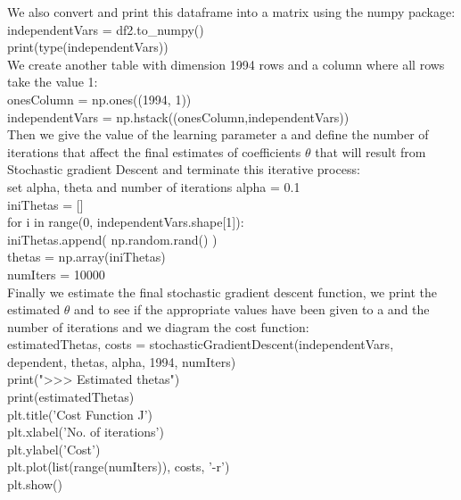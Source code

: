 \documentclass[10pt,a4paper]{article}
\begin{document}
We also convert and print this dataframe into a matrix using the numpy package:\\
independentVars = df2.to\_numpy()\\
print(type(independentVars))\\

We create another table with dimension 1994 rows and a column where all rows take the value 1:\\
onesColumn = np.ones((1994, 1))\\
independentVars = np.hstack((onesColumn,independentVars))\\

Then we give the value of the learning parameter a and define the number of iterations that affect the final estimates of coefficients $\theta$ that will result from Stochastic gradient Descent and terminate this iterative process:\\
set alpha, theta and number of iterations
alpha = 0.1\\
iniThetas = []\\
for i in range(0, independentVars.shape[1]):\\
iniThetas.append( np.random.rand() )\\
thetas = np.array(iniThetas)\\
numIters = 10000\\

Finally we estimate the final stochastic gradient descent function, we print the estimated $\theta$ and to see if the appropriate values have been given to a and the number of iterations and we diagram the cost function:\\
estimatedThetas, costs = stochasticGradientDescent(independentVars, dependent, thetas, alpha, 1994, numIters)\\
print(">>> Estimated thetas")\\
print(estimatedThetas)\\
plt.title('Cost Function J')\\
plt.xlabel('No. of iterations')\\
plt.ylabel('Cost')\\
plt.plot(list(range(numIters)), costs, '-r')\\
plt.show()\\
\\
\\
\\
\\
\\
\\
\\
\end{document}
